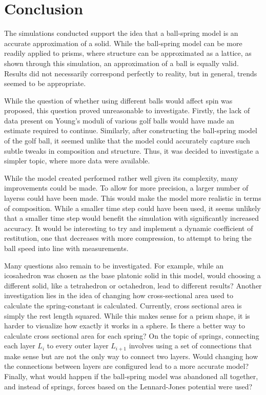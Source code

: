 \documentclass{article}
\begin{document}
\section{Conclusion}

The simulations conducted support the idea that a ball-spring model is an accurate approximation of a solid. While the ball-spring model can be more readily applied to prisms, where structure can be approximated as a lattice, as shown through this simulation, an approximation of a ball is equally valid. Results did not necessarily correspond perfectly to reality, but in general, trends seemed to be appropriate.

While the question of whether using dif\mbox{f}erent balls would af\mbox{f}ect spin was proposed, this question proved unreasonable to investigate. Firstly, the lack of data present on Young's moduli of various golf balls would have made an estimate required to continue. Similarly, after constructing the ball-spring model of the golf ball, it seemed unlike that the model could accurately capture such subtle tweaks in composition and structure. Thus, it was decided to investigate a simpler topic, where more data were available.

While the model created performed rather well given its complexity, many improvements could be made. To allow for more precision, a larger number of layerss could have been made. This would make the model more realistic in terms of composition. While a smaller time step could have been used, it seems unlikely that a smaller time step would benefit the simulation with significantly increased accuracy. It would be interesting to try and implement a dynamic coef\mbox{f}icient of restitution, one that decreases with more compression, to attempt to bring the ball speed into line with measurements. 

Many questions also remain to be investigated. For example, while an icosahedron was chosen as the base platonic solid in this model, would choosing a dif\mbox{f}erent solid, like a tetrahedron or octahedron, lead to dif\mbox{f}erent results? Another investigation lies in the idea of changing how cross-sectional area used to calculate the spring-constant is calculated. Currently, cross sectional area is simply the rest length squared. While this makes sense for a prism shape, it is harder to visualize how exactly it works in a sphere. Is there a better way to calculate cross sectional area for each spring? On the topic of springs, connecting each layer $L_{i}$ to every outer layer $L_{i + 1}$ involves using a set of connections that make sense but are not the only way to connect two layers. Would changing how the connections between layers are configured lead to a more accurate model? Finally, what would happen if the ball-spring model was abandoned all together, and instead of springs, forces based on the Lennard-Jones potential were used?
\end{document}
